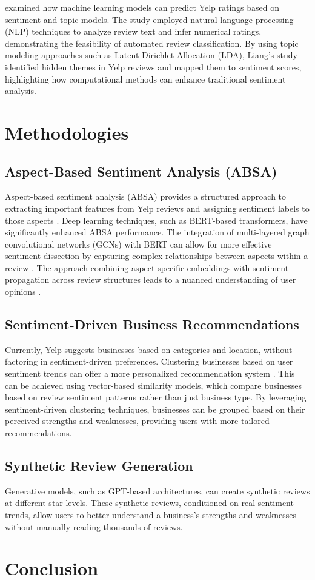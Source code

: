 \documentclass{article}
\begin{document}
\cite{Liang2018} examined how machine learning models can predict Yelp ratings based on sentiment and topic models. The study employed natural language processing (NLP) techniques to analyze review text and infer numerical ratings, demonstrating the feasibility of automated review classification. By using topic modeling approaches such as Latent Dirichlet Allocation (LDA), Liang’s study identified hidden themes in Yelp reviews and mapped them to sentiment scores, highlighting how computational methods can enhance traditional sentiment analysis.

\section{Methodologies}

\subsection{Aspect-Based Sentiment Analysis (ABSA)}
Aspect-based sentiment analysis (ABSA) provides a structured approach to extracting important features from Yelp reviews and assigning sentiment labels to those aspects \citep{HuLiu2004}. Deep learning techniques, such as BERT-based transformers, have significantly enhanced ABSA performance. The integration of multi-layered graph convolutional networks (GCNs) with BERT can allow for more effective sentiment dissection by capturing complex relationships between aspects within a review \citep{Aziz2024}. The approach combining aspect-specific embeddings with sentiment propagation across review structures leads to a nuanced understanding of user opinions \citep{Aziz2024}.

\subsection{Sentiment-Driven Business Recommendations}
Currently, Yelp suggests businesses based on categories and location, without factoring in sentiment-driven preferences. Clustering businesses based on user sentiment trends can offer a more personalized recommendation system \citep{KellerKostromitina2020}. This can be achieved using vector-based similarity models, which compare businesses based on review sentiment patterns rather than just business type. By leveraging sentiment-driven clustering techniques, businesses can be grouped based on their perceived strengths and weaknesses, providing users with more tailored recommendations.

\subsection{Synthetic Review Generation}
Generative models, such as GPT-based architectures, can create synthetic reviews at different star levels. These synthetic reviews, conditioned on real sentiment trends, allow users to better understand a business’s strengths and weaknesses without manually reading thousands of reviews.

\section{Conclusion}

\newpage

\nocite{*}

\end{document}
